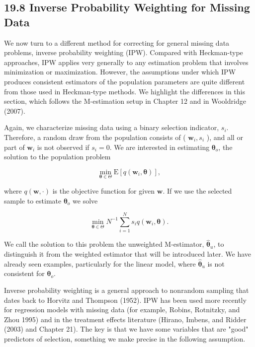 \documentclass[10pt]{article}
\begin{document}
\subsection*{19.8 Inverse Probability Weighting for Missing Data}
We now turn to a different method for correcting for general missing data problems, inverse probability weighting (IPW). Compared with Heckman-type approaches, IPW applies very generally to any estimation problem that involves minimization or maximization. However, the assumptions under which IPW produces consistent estimators of the population parameters are quite different from those used in Heckman-type methods. We highlight the differences in this section, which follows the M-estimation setup in Chapter 12 and in Wooldridge (2007).

Again, we characterize missing data using a binary selection indicator, $s_{i}$. Therefore, a random draw from the population consists of ( $\mathbf{w}_{i}, s_{i}$ ), and all or part of $\mathbf{w}_{i}$ is not observed if $s_{i}=0$. We are interested in estimating $\boldsymbol{\theta}_{o}$, the solution to the population problem


\begin{equation*}
\min _{\boldsymbol{\theta} \in \Theta} \mathrm{E}\left[q\left(\mathbf{w}_{i}, \boldsymbol{\theta}\right)\right], \tag{19.80}
\end{equation*}


where $q(\mathbf{w}, \cdot)$ is the objective function for given $\mathbf{w}$. If we use the selected sample to estimate $\boldsymbol{\theta}_{o}$ we solve


\begin{equation*}
\min _{\boldsymbol{\theta} \in \Theta} N^{-1} \sum_{i=1}^{N} s_{i} q\left(\mathbf{w}_{i}, \boldsymbol{\theta}\right) . \tag{19.81}
\end{equation*}


We call the solution to this problem the unweighted M-estimator, $\hat{\boldsymbol{\theta}}_{u}$, to distinguish it from the weighted estimator that will be introduced later. We have already seen examples, particularly for the linear model, where $\hat{\boldsymbol{\theta}}_{u}$ is not consistent for $\boldsymbol{\theta}_{o}$.

Inverse probability weighting is a general approach to nonrandom sampling that dates back to Horvitz and Thompson (1952). IPW has been used more recently for regression models with missing data (for example, Robins, Rotnitzky, and Zhou 1995) and in the treatment effects literature (Hirano, Imbens, and Ridder (2003) and Chapter 21). The key is that we have some variables that are "good" predictors of selection, something we make precise in the following assumption.
\end{document}
